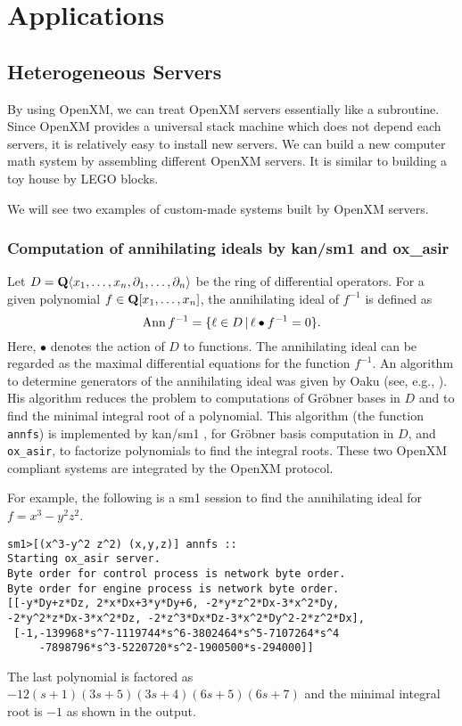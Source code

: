 \section{Applications}

\subsection{Heterogeneous Servers}

\def\pd#1{ \partial_{#1} }

By using OpenXM, we can treat OpenXM servers essentially 
like a subroutine.
Since OpenXM provides a universal stack machine which does not
depend each servers, 
it is relatively easy to install new servers.
We can build a new computer math system by assembling
different OpenXM servers.
It is similar to building a toy house by LEGO blocks.

We will see two examples of custom-made systems
built by OpenXM servers.

\subsubsection{Computation of annihilating ideals by kan/sm1 and ox\_asir}

Let $D = {\bf Q} \langle x_1, \ldots, x_n , \pd{1}, \ldots, \pd{n} \rangle$
be the ring of differential operators.
For a given polynomial
$ f \in {\bf Q}[x_1, \ldots, x_n] $,
the annihilating ideal of $f^{-1}$ is defined as
$$ {\rm Ann}\, f^{-1} = \{ \ell \in D \,|\,
  \ell \bullet f^{-1} = 0 \}.
$$
Here, $\bullet$ denotes the action of $D$ to functions.
The annihilating ideal can be regarded as the maximal differential
equations for the function $f^{-1}$.
An algorithm to determine generators of the annihilating ideal
was given by Oaku (see, e.g., \cite[5.3]{sst-book}).
His algorithm reduces the problem to computations of Gr\"obner bases
in $D$ and to find the minimal integral root of a polynomial.
This algorithm (the function {\tt annfs}) is implemented by
kan/sm1 \cite{kan}, for Gr\"obner basis computation in $D$, and
{\tt ox\_asir}, to factorize polynomials to find the integral
roots.
These two OpenXM compliant systems are integrated by
the OpenXM protocol.

For example, the following is a sm1 session to find the annihilating
ideal for $f = x^3 - y^2 z^2$.
\begin{verbatim}
sm1>[(x^3-y^2 z^2) (x,y,z)] annfs ::
Starting ox_asir server.
Byte order for control process is network byte order.
Byte order for engine process is network byte order.
[[-y*Dy+z*Dz, 2*x*Dx+3*y*Dy+6, -2*y*z^2*Dx-3*x^2*Dy, 
-2*y^2*z*Dx-3*x^2*Dz, -2*z^3*Dx*Dz-3*x^2*Dy^2-2*z^2*Dx], 
 [-1,-139968*s^7-1119744*s^6-3802464*s^5-7107264*s^4
     -7898796*s^3-5220720*s^2-1900500*s-294000]] 
\end{verbatim}
The last polynomial is factored as
$-12(s+1)(3s+5)(3s+4)(6s+5)(6s+7)$
and the minimal integral root is $-1$
as shown in the output.

